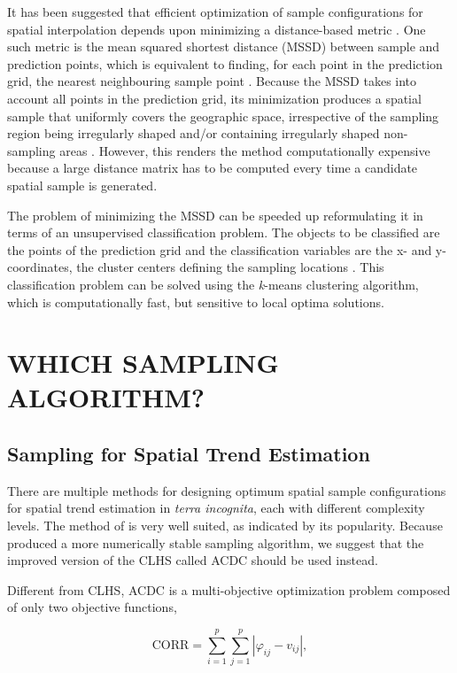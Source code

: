 It has been suggested that efficient optimization of sample configurations for spatial interpolation depends 
upon minimizing a distance-based metric \cite{RoyleEtAl1998}. One such metric is the mean squared shortest 
distance (MSSD) between sample and prediction points, which is equivalent to finding, for each point in the 
prediction grid, the nearest neighbouring sample point  \cite{BrusEtAl2006}. Because the MSSD takes into 
account all points in the prediction grid, its minimization produces a spatial sample that uniformly covers the 
geographic space, irrespective of the sampling region being irregularly shaped and/or containing 
irregularly shaped non-sampling areas \cite{WalvoortEtAl2010}. However, this renders the method computationally 
expensive because a large distance matrix has to be computed every time a candidate spatial sample is 
generated.

The problem of minimizing the MSSD can be speeded up reformulating it in terms of an unsupervised 
classification problem. The objects to be classified are the points of the prediction grid and the 
classification variables are the x- and y-coordinates, the cluster centers defining the sampling locations 
\cite{WalvoortEtAl2010}. This classification problem can be solved using the \textit{k}-means clustering 
algorithm, which is computationally fast, but sensitive to local optima solutions.

\section{WHICH SAMPLING ALGORITHM?}

\subsection{Sampling for Spatial Trend Estimation}

There are multiple methods for designing optimum spatial sample configurations for spatial trend estimation in 
\emph{terra incognita}, each with different complexity levels. The method of \citet{MinasnyEtAl2006b} is very 
well suited, as indicated by its popularity. Because \citet{Samuel-RosaEtAl2016} produced a more numerically 
stable sampling algorithm, we suggest that the improved version of the CLHS called ACDC should be used instead.

Different from CLHS, ACDC is a multi-objective optimization problem composed of only two objective functions,

\begin{equation}\label{eqn:chap09-corr} %
 \text{CORR} = \sum_{i=1}^{p}\sum_{j=1}^{p}|\varphi_{ij} - v_{ij}|,
\end{equation}

